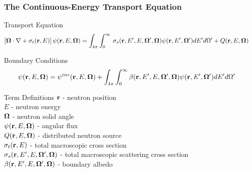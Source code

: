 \documentclass[compress,10pt]{beamer}
\begin{document}
\typeout{***********************************************************************************}
\begin{frame}[t]\frametitle{The Continuous-Energy Transport Equation}
\begin{block}{Transport Equation}{\footnotesize
\begin{equation*}
\left[ { \bf \Omega} \cdot {\bf \nabla}  + \sigma_t ({\bf r}, E) \right] \psi ({\bf r}, E, {\bf \Omega}) = \int_{4 \pi} \int_{0}^{\infty}  \, \sigma_s ({\bf r}, E' , E, {\bf \Omega}' , {\bf \Omega}) \psi ({\bf r}, E', {\bf \Omega}') d E'  d \Omega'+ Q ({\bf r}, E, {\bf \Omega})
\end{equation*}
}\end{block}
\begin{block}{Boundary Conditions}{\footnotesize
\begin{equation*}
\psi ({\bf r}, E, {\bf \Omega}) = \psi^{inc} ({\bf r}, E, {\bf \Omega}) +  \int_{4 \pi} \int_{0}^{\infty} \beta ({\bf r}, E' , E, {\bf \Omega}' , {\bf \Omega}) \psi ({\bf r}, E', {\bf \Omega}') d E'  d \Omega'
\end{equation*}
}\end{block}
\begin{block}{Term Definitions} {\footnotesize
${\bf r}$ -  neutron position \\
$E$ -  neutron energy \\
${\bf \Omega}$ - neutron solid angle \\
$\psi  ({\bf r}, E, {\bf \Omega})$ - angular flux  \\
$Q  ({\bf r}, E, {\bf \Omega})$ - distributed neutron source \\
$\sigma_t ({\bf r}, E)$ - total macroscopic cross section \\
$\sigma_s ({\bf r}, E' , E, {\bf \Omega}' , {\bf \Omega})$ - total macroscopic scattering cross section\\
$\beta ({\bf r}, E' , E, {\bf \Omega}' , {\bf \Omega})$ - boundary albedo 
}\end{block}
\end{frame}
\typeout{***********************************************************************************}
\end{document}
